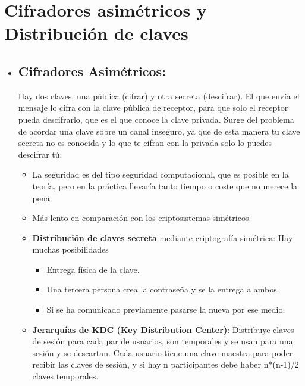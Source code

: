 \documentclass[12pt, twoside, openright]{report} %
\begin{document}
  \section{Cifradores asimétricos y Distribución de claves}
  \begin{itemize}
  \item \subsection{Cifradores Asimétricos:} Hay dos claves, una pública
    (cifrar) y otra secreta (descifrar). El que envía el mensaje lo
    cifra con la clave pública de receptor, para que solo el receptor
    pueda descifrarlo, que es el que conoce la clave privada. Surge del
    problema de acordar una clave sobre un canal inseguro, ya que de
    esta manera tu clave secreta no es conocida y lo que te cifran con
    la privada solo lo puedes descifrar tú.
    

    \begin{itemize}
    \item La seguridad es del tipo seguridad computacional, que es posible
      en la teoría, pero en la práctica llevaría tanto tiempo o coste
      que no merece la pena.
      
    \item Más lento en comparación con los criptosistemas simétricos.
      
    \end{itemize}

    \begin{itemize}
    \item \textbf{Distribución de claves secreta} mediante criptografía
      simétrica: Hay muchas posibilidades
      

      \begin{itemize}
      \item Entrega física de la clave.
        
      \item Una tercera persona crea la contraseña y se la entrega a ambos.
        
      \item Si se ha comunicado previamente pasarse la nueva por ese medio.
        
      \end{itemize}
    \item \textbf{Jerarquías de KDC (Key Distribution Center)}: Distribuye
      claves de sesión para cada par de usuarios, son temporales y se
      usan para una sesión y se descartan. Cada usuario tiene una clave
      maestra para poder recibir las claves de sesión, y si hay n
      participantes debe haber n*(n-1)/2 claves temporales.
      

\end{itemize}
\end{itemize}
\end{document}

